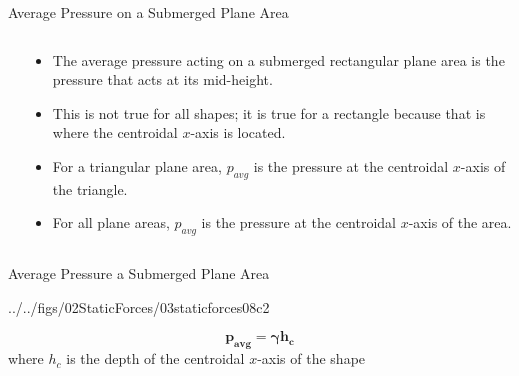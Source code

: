 \documentclass[9pt,xcolor={svgnames, x11names},professionalfonts, mathserif]{beamer}
\begin{document}
\begin{frame}{Average Pressure on a Submerged Plane Area}
 \begin{columns}
  \begin{column}{0.45\textwidth}
  \end{column}
  \begin{column}{0.5\textwidth}
   \begin{itemize}
    \item The average pressure acting on a submerged rectangular plane area is the pressure that acts at its mid-height. \pause
    \item This is not true for all shapes; it is true for a rectangle because that is where the centroidal $x$-axis is located.  \pause
    \item For a triangular plane area, $p_{avg}$ is the pressure at the   centroidal $x$-axis of the triangle.  \pause
    \item For all plane areas, $p_{avg}$ is the pressure at the   centroidal $x$-axis of the area. \end{itemize}
    \end{column}
    \end{columns}

    \end{frame}

    \begin{frame}{Average Pressure a Submerged Plane Area}
     \centering
     \begin{cfig}[0.55]{../../figs/02StaticForces/03staticforces08c2}\end{cfig}
     \begin{mybox}[width=10cm, title=Average Pressure on a Submerged Plane Area]

      $$\bm{ p_{avg} = \gamma h_c }$$
      \centering
      where $h_c$ is the depth of the centroidal $x$-axis of the shape

     \end{mybox}
    \end{frame}
\end{document}
